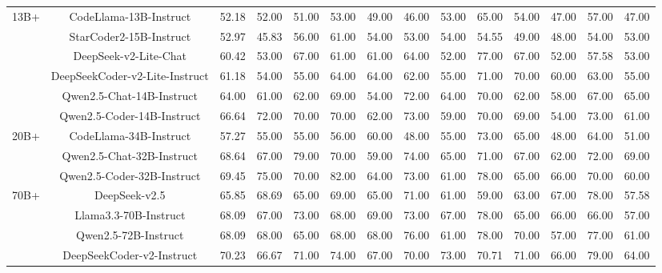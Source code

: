 \documentclass[11pt, a4paper, logo, copyright, nonumbering, amsart]{map}
\begin{document}
\begin{CJK*}{UTF8}{gbsn}
\begin{table*}[h!]
\begin{adjustbox}{width=\textwidth}
\begin{tabular}{c|c|cccccccccccc}
    \midrule
    \multirow{6}{*}{13B+} 
    & CodeLlama-13B-Instruct & 52.18 & 52.00 & 51.00 & 53.00 & 49.00 & 46.00 & 53.00 & 65.00 & 54.00 & 47.00 & 57.00 & 47.00 \\
    & StarCoder2-15B-Instruct & 52.97 & 45.83 & 56.00 & 61.00 & 54.00 & 53.00 & 54.00 & 54.55 & 49.00 & 48.00 & 54.00 & 53.00 \\
    & DeepSeek-v2-Lite-Chat & 60.42 & 53.00 & 67.00 & 61.00 & 61.00 & 64.00 & 52.00 & 77.00 & 67.00 & 52.00 & 57.58 & 53.00 \\
    & DeepSeekCoder-v2-Lite-Instruct & 61.18 & 54.00 & 55.00 & 64.00 & 64.00 & 62.00 & 55.00 & 71.00 & 70.00 & 60.00 & 63.00 & 55.00 \\
    & Qwen2.5-Chat-14B-Instruct & 64.00 & 61.00 & 62.00 & 69.00 & 54.00 & 72.00 & 64.00 & 70.00 & 62.00 & 58.00 & 67.00 & 65.00 \\
    & Qwen2.5-Coder-14B-Instruct & 66.64 & 72.00 & 70.00 & 70.00 & 62.00 & 73.00 & 59.00 & 70.00 & 69.00 & 54.00 & 73.00 & 61.00 \\
    
    \midrule
    \multirow{3}{*}{20B+}
    & CodeLlama-34B-Instruct & 57.27 & 55.00 & 55.00 & 56.00 & 60.00 & 48.00 & 55.00 & 73.00 & 65.00 & 48.00 & 64.00 & 51.00 \\
    & Qwen2.5-Chat-32B-Instruct & 68.64 & 67.00 & 79.00 & 70.00 & 59.00 & 74.00 & 65.00 & 71.00 & 67.00 & 62.00 & 72.00 & 69.00 \\
    & Qwen2.5-Coder-32B-Instruct & 69.45 & 75.00 & 70.00 & 82.00 & 64.00 & 73.00 & 61.00 & 78.00 & 65.00 & 66.00 & 70.00 & 60.00 \\
    
    \midrule
    \multirow{4}{*}{70B+} 
    & DeepSeek-v2.5 & 65.85 & 68.69 & 65.00 & 69.00 & 65.00 & 71.00 & 61.00 & 59.00 & 63.00 & 67.00 & 78.00 & 57.58 \\
    & Llama3.3-70B-Instruct & 68.09 & 67.00 & 73.00 & 68.00 & 69.00 & 73.00 & 67.00 & 78.00 & 65.00 & 66.00 & 66.00 & 57.00 \\
    & Qwen2.5-72B-Instruct & 68.09 & 68.00 & 65.00 & 68.00 & 68.00 & 76.00 & 61.00 & 78.00 & 70.00 & 57.00 & 77.00 & 61.00 \\
    & DeepSeekCoder-v2-Instruct & 70.23 & 66.67 & 71.00 & 74.00 & 67.00 & 70.00 & 73.00 & 70.71 & 71.00 & 66.00 & 79.00 & 64.00 \\
    

\end{tabular}
\end{adjustbox}
\end{table*}
\end{CJK*}
\end{document}
